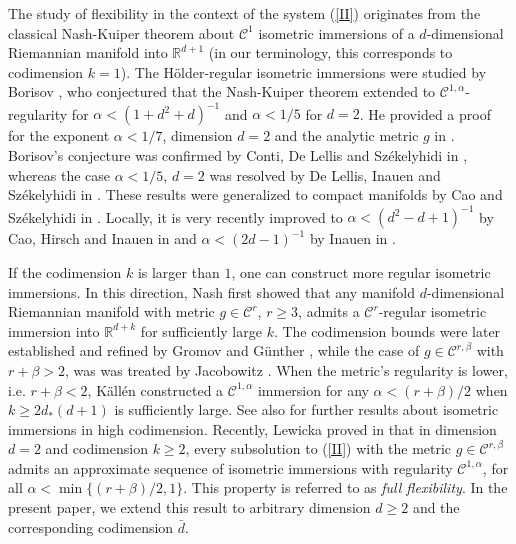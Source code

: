 \documentclass[reqno,twoside,11pt]{amsart}
\numberwithin{equation}{section}
\theoremstyle{plain}
\theoremstyle{definition}
\begin{document}
\noindent The study of flexibility in the context of the system (\ref{II}) originates from the
classical Nash-Kuiper theorem \cite{Nash1, Kuiper} about
$\mathcal{C}^1$ isometric immersions of a $d$-dimensional Riemannian manifold
into $\mathbb{R}^{d+1}$ (in our terminology, this corresponds to
codimension $k=1$). The H\"older-regular isometric
immersions were studied by Borisov \cite{Borisov1958,Borisov1965}, who conjectured that
the Nash-Kuiper theorem extended to $\mathcal{C}^{1,\alpha}$-regularity for
$\alpha < (1 + d^2 + d)^{-1}$ and $\alpha < 1/5$ for $d = 2$.  
He provided a proof for the exponent $\alpha < 1/7$, dimension $d=2$
and the analytic metric $g$ in \cite{Borisov2004}. 
Borisov's conjecture was confirmed by Conti, De Lellis and Sz\'ekelyhidi
in \cite{CDS}, whereas the case
$\alpha < 1/5$, $d = 2$ was resolved by De Lellis, Inauen and Sz\'ekelyhidi in \cite{DIS1/5}.  
These results were generalized to compact manifolds by Cao and
Sz\'ekelyhidi in \cite{CaoSze2022}. Locally, it is very recently improved to 
$\alpha < (d^2 - d + 1)^{-1}$ by Cao, Hirsch and Inauen in \cite{CHI2}
and $\alpha<(2d-1)^{-1}$ by Inauen in \cite{In2026}.

\medskip

\noindent If the codimension $k$ is larger than $1$, one can construct more regular isometric
immersions. In this direction, Nash first showed \cite{Nash2} that any
manifold $d$-dimensional Riemannian manifold with metric $g \in
\mathcal{C}^r$, $r \geq 3$, admits a
$\mathcal{C}^r$-regular isometric immersion into $\mathbb{R}^{d+k}$
for sufficiently large $k$.  
The codimension bounds were later established and refined by Gromov
\cite{GromovPdr} and G\"unther \cite{Guenther}, while the case of  $g \in
\mathcal{C}^{r,\beta}$ with $r+\beta>2$, was was treated by Jacobowitz \cite{Jaco}.
When the metric's regularity is lower, i.e. $
r + \beta<2$, K\"all\'en \cite{Kallen} constructed a
$\mathcal{C}^{1,\alpha}$ immersion for any $\alpha < (r + \beta)/2$
when $k \geq 2d_*(d+1)$ is sufficiently large. 
See also \cite{DI2020,CaoIn2024,CaoSz2025} for further
results about isometric immersions in high codimension. 
Recently, Lewicka proved in  \cite{lew_full2d2k} that in dimension
$d=2$ and codimension $k\geq 2$, every
subsolution to (\ref{II}) with the metric $g\in\mathcal{C}^{r,\beta}$
admits an approximate sequence of isometric
immersions  with regularity $\mathcal{C}^{1,\alpha}$, for all
$\alpha<\min\{(r+\beta)/2, 1\}$. 
This property is referred to as {\em full flexibility}. In the present
paper, we extend this result to arbitrary dimension $d\geq 2$ and the corresponding codimension 
$\bar d$.
\end{document}
